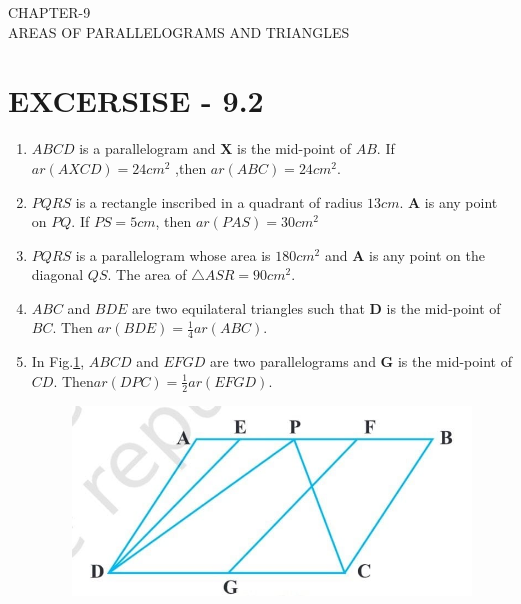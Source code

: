 \documentclass{article}
\let\vec\mathbf{}
\let\vec\mathbf
\begin{document}
\begin{center}
\textbf\large{CHAPTER-9  \\ AREAS OF PARALLELOGRAMS AND TRIANGLES}
\section*{EXCERSISE - 9.2}
\end{center}
\begin{enumerate}
\item $ABCD$ is a parallelogram and $\vec{X}$ is the mid-point of $AB$. If $ ar(AXCD)= 24 cm^2 $ ,then $ar(ABC) =  24 cm^2 $.
\item $PQRS$ is a rectangle inscribed in a quadrant of radius $13 cm$. $\vec{A}$ is any point on $PQ$. If $PS=5 cm$, then $ar(PAS)= 30 cm^2 $
\item $PQRS$ is a parallelogram whose area is $ 180 cm^2 $ and $\vec{A}$ is any point on the diagonal $QS$. The area of $\triangle ASR =90 cm^2$.
\item $ABC$ and $BDE$ are two equilateral triangles such that $\vec{D}$ is the mid-point of $BC$. Then $ar(BDE)=\frac{1}{4}  ar(ABC)$.
\item In Fig.\ref{figs:9.8.}, $ABCD$ and $EFGD$ are two parallelograms and $\vec{G}$ is the mid-point of $CD$. Then$ ar(DPC)=\frac{1}{2}  ar(EFGD)$.
\begin{figure}[h]
	\centering
	\includegraphics[width=\columnwidth]{figs/9.8.jpg}
	\caption{}
	\label{figs:9.8.}
\end{figure}

\end{enumerate}
\end{document}
